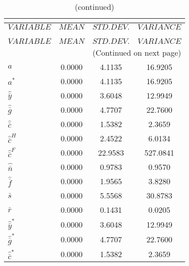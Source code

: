  
\begin{center}
\begin{longtable}{lccc} 
\caption{THEORETICAL MOMENTS}\\
 \label{Table:th_moments}\\
\toprule 
$VARIABLE              $	 & 	 $         MEAN$	 & 	 $    STD. DEV.$	 & 	 $     VARIANCE$\\
\midrule \endfirsthead 
\caption{(continued)}\\
 \toprule \\ 
$VARIABLE              $	 & 	 $         MEAN$	 & 	 $    STD. DEV.$	 & 	 $     VARIANCE$\\
\midrule \endhead 
\midrule \multicolumn{4}{r}{(Continued on next page)} \\ \bottomrule \endfoot 
\bottomrule \endlastfoot 
${a}                   $	 & 	       0.0000	 & 	       4.1135	 & 	      16.9205 \\ 
${a^*}                 $	 & 	       0.0000	 & 	       4.1135	 & 	      16.9205 \\ 
${\hat {\bar y}}       $	 & 	       0.0000	 & 	       3.6048	 & 	      12.9949 \\ 
${\hat {\bar g}}       $	 & 	       0.0000	 & 	       4.7707	 & 	      22.7600 \\ 
${\hat {\bar c}}       $	 & 	       0.0000	 & 	       1.5382	 & 	       2.3659 \\ 
${\hat {\bar c}^H}     $	 & 	       0.0000	 & 	       2.4522	 & 	       6.0134 \\ 
${\hat {\bar c}^F}     $	 & 	       0.0000	 & 	      22.9583	 & 	     527.0841 \\ 
${\hat {\bar n}}       $	 & 	       0.0000	 & 	       0.9783	 & 	       0.9570 \\ 
${\hat {\bar f}}       $	 & 	       0.0000	 & 	       1.9565	 & 	       3.8280 \\ 
${\bar s}              $	 & 	       0.0000	 & 	       5.5568	 & 	      30.8783 \\ 
${\bar r}              $	 & 	       0.0000	 & 	       0.1431	 & 	       0.0205 \\ 
${\hat {\bar y}^*}     $	 & 	       0.0000	 & 	       3.6048	 & 	      12.9949 \\ 
${\hat {\bar g}^*}     $	 & 	       0.0000	 & 	       4.7707	 & 	      22.7600 \\ 
${\hat {\bar c}^*}     $	 & 	       0.0000	 & 	       1.5382	 & 	       2.3659 \\ 

\end{longtable}
\end{center}
